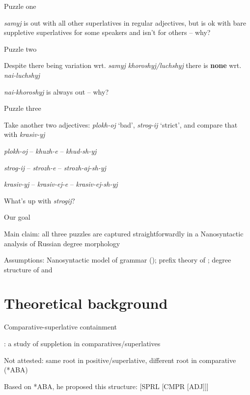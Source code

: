 \documentclass[xcolor=table]{beamer}
\begin{document}
	\begin{frame}{Puzzle one}

		\textit{samyj} is out with all other superlatives in regular adjectives, but is ok with bare suppletive superlatives for some speakers and isn't for others -- why?

	\end{frame}

	\begin{frame}{Puzzle two}

		Despite there being variation wrt. \textit{samyj khoroshyj/luchshyj} there is \textbf{none} wrt. \textit{nai-luchshyj}

		\textit{nai-khoroshyj} is always out -- why?
	\end{frame}

	\begin{frame}{Puzzle three}

		Take another two adjectives: \textit{plokh-oj} `bad', \textit{strog-ij} `strict', and compare that with \textit{krasiv-yj}

		\textit{plokh-oj} -- \textit{khuzh-e} -- \textit{khud-sh-yj}

		\textit{strog-ij} -- \textit{strozh-e} -- \textit{strozh-aj-sh-yj}

		\textit{krasiv-yj} -- \textit{krasiv-ej-e} -- \textit{krasiv-ej-sh-yj}

		What's up with \textit{strogij}?		

	\end{frame}

	\begin{frame}{Our goal}

		Main claim: all three puzzles are captured straightforwardly in a Nanosyntactic analysis of Russian degree morphology

		Assumptions: Nanosyntactic model of grammar (\cite{Starke:2010}); prefix theory of \textcite{Starke:2018}; degree structure of \textcite{Bobaljik:2012} and \textcite{Caha:2022}

	\end{frame}

	\section{Theoretical background}

	\begin{frame}{Comparative-superlative containment}

		\cite{Bobaljik:2012}: a study of suppletion in comparatives/superlatives

		Not attested: same root in positive/superlative, different root in comparative (*ABA)

		Based on *ABA, he proposed this structure: [SPRL [CMPR [ADJ]]]

	\end{frame}
\end{document}
